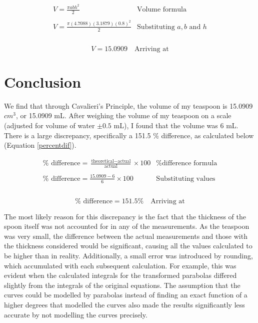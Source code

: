 \documentclass[12pt]{article}
\begin{document}
$$
\begin{array}{l|c}
    V = \frac{\pi a b h^2}{2} & \text{Volume formula} \\ \\
    V = \frac{\pi (4.7088)(3.1879)(0.8)^2}{2} & \text{Substituting } a, b \text{ and } h \\ \\
 \end{array}
$$

\begin{equation}\label{solve.a!}
    \boxed{V = 15.0909}  \quad \text{Arriving at}
\end{equation}


\section{Conclusion}

We find that through Cavalieri's Principle, the volume of my teaspoon is 15.0909 $cm^3$, or 15.0909 mL. After weighing the volume of my teaspoon on a scale (adjusted for volume of water $\pm 0.5$ mL), I found that the volume was 6 mL. There is a large discrepancy, specifically a 151.5 \% difference, as calculated below (Equation \ref{percentdif}). 

$$
\begin{array}{l|c}
    \% \text{ difference} = \frac{\text{theoretical} - \text{actual}}{\text{actual}} \times 100 & \text{\% difference formula} \\ \\
    \% \text{ difference} = \frac{15.0909 - 6}{6} \times 100 & \text{Substituting values} \\ \\
 \end{array}
$$

\begin{equation}\label{percentdif}
    \boxed{\% \text{ difference} = 151.5 \%}  \quad \text{Arriving at}
\end{equation}

The most likely reason for this discrepancy is the fact that the thickness of the spoon itself was not accounted for in any of the measurements. As the teaspoon was very small, the difference between the actual measurements and those with the thickness considered would be significant, causing all the values calculated to be higher than in reality. Additionally, a small error was introduced by rounding, which accumulated with each subsequent calculation. For example, this was evident when the calculated integrals for the transformed parabolas differed slightly from the integrals of the original equations. The assumption that the curves could be modelled by parabolas instead of finding an exact function of a higher degrees that modelled the curves also made the results significantly less accurate by not modelling the curves precisely. 
\end{document}
